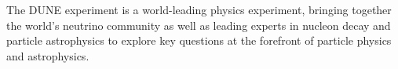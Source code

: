 The DUNE experiment is a world-leading physics experiment, bringing together the
world's neutrino community as well as leading experts in nucleon decay and particle astrophysics 
to explore key questions at the forefront of
particle physics and astrophysics. 













